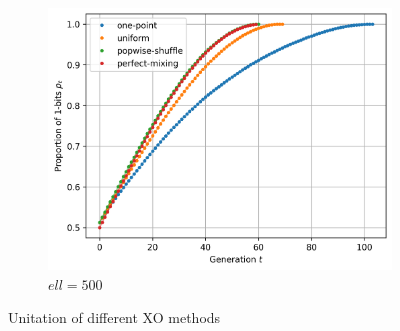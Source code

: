 \documentclass{article}
\begin{document}
\begin{enumerate}[label=(\alph*)]
\begin{figure}[h]
            \hfill
            \begin{subfigure}[b]{0.32\linewidth}
                  \centering
                  \includegraphics[width=\linewidth]{fig-uni_500.png}
                  \caption{$ell=500$}
                  \label{fig:uni-500}
            \end{subfigure}
            \caption{Unitation of different XO methods}
            \label{fig:unitation}
      \end{figure}
      

\end{enumerate}
\end{document}
